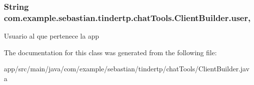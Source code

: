 \subsubsection[{\texorpdfstring{user}{user}}]{\setlength{\rightskip}{0pt plus 5cm}String com.\+example.\+sebastian.\+tindertp.\+chat\+Tools.\+Client\+Builder.\+user\hspace{0.3cm}{\ttfamily [static]}, {\ttfamily [private]}}\hypertarget{classcom_1_1example_1_1sebastian_1_1tindertp_1_1chatTools_1_1ClientBuilder_a5689629482292f87ffd3c7786568f7d6}{}\label{classcom_1_1example_1_1sebastian_1_1tindertp_1_1chatTools_1_1ClientBuilder_a5689629482292f87ffd3c7786568f7d6}
Usuario al que pertenece la app 

The documentation for this class was generated from the following file\+:\begin{DoxyCompactItemize}
\item 
app/src/main/java/com/example/sebastian/tindertp/chat\+Tools/Client\+Builder.\+java\end{DoxyCompactItemize}
